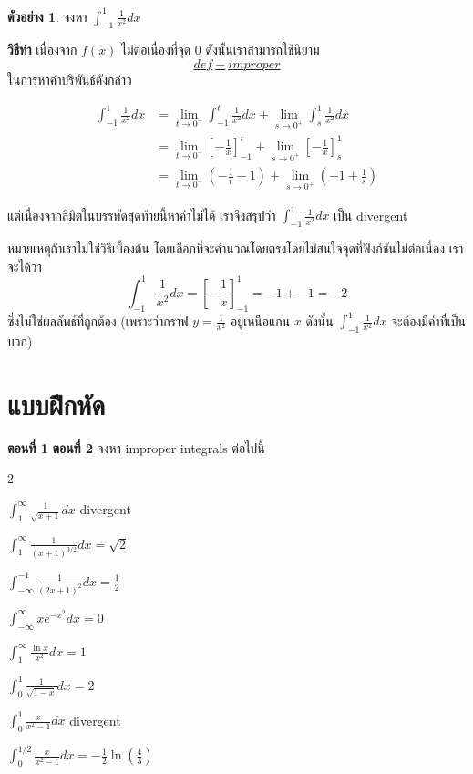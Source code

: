 \documentclass[
]{book}
\theoremstyle{definition}
\theoremstyle{definition}
\newtheorem{example}{ตัวอย่าง}[chapter]
\theoremstyle{definition}
\theoremstyle{definition}
\theoremstyle{remark}
\begin{document}
\begin{example}
จงหา \(\int_{-1}^{1} \frac{1}{x^2} dx\)
\end{example}

\textbf{วิธีทำ} เนื่องจาก \(f(x)\) ไม่ต่อเนื่องที่จุด 0 ดังนั้นเราสามารถใช้นิยาม
\hyperref[def-improper]{\[def-improper\]} ในการหาค่าปริพันธ์ดังกล่าว  

\[\begin{aligned}
        \int_{-1}^{1} \frac{1}{x^2} dx &= \lim_{t \rightarrow 0^{-} }\int_{-1}^{t} \frac{1}{x^2}dx
                                            + \lim_{s \rightarrow 0^{+}} \int_{s}^{1} \frac{1}{x^2}dx \\
        &= \lim_{t \rightarrow 0^{-}} \left[ -\frac{1}{x}\right]_{-1}^t 
        + \lim_{s \rightarrow 0^{+}} \left[ -\frac{1}{x}\right]_{s}^1 \\
        &= \lim_{t \rightarrow 0^{-}} (-\frac{1}{t} - 1) + \lim_{s \rightarrow 0^{+}} (-1 +\frac{1}{s})    
\end{aligned}\]

  แต่เนื่องจากลิมิตในบรรทัดสุดท้ายนี้หาค่าไม่ได้ เราจึงสรุปว่า
\(\int_{-1}^{1} \frac{1}{x^2} dx\) เป็น divergent

หมายเหตุถ้าเราไม่ใช่วิธีเบื้องต้น โดยเลือกที่จะคำนวณโดยตรงโดยไม่สนใจจุดที่ฟังก์ชันไม่ต่อเนื่อง
เราจะได้ว่า
\[\int_{-1}^{1} \frac{1}{x^2} dx  = \left[ -\frac{1}{x}\right]_{-1}^1 = -1 + -1 = -2\]
ซึ่งไม่ใช่ผลลัพธ์ที่ถูกต้อง (เพราะว่ากราฟ \(y = \frac{1}{x^2}\) อยู่เหนือแกน \(x\) ดังนั้น
\(\int_{-1}^{1} \frac{1}{x^2} dx\) จะต้องมีค่าที่เป็นบวก)

\section{แบบฝึกหัด}\label{uxe41uxe1auxe1auxe1duxe01uxe2buxe14-1}

\textbf{ตอนที่ 1} \textbf{ตอนที่ 2} จงหา improper integrals ต่อไปนี้

2

\(\int_{1}^{\infty} \frac{1}{\sqrt{x+1}} dx\) divergent

\(\int_{1}^{\infty} \frac{1}{(x+1)^{3/2}}dx = \sqrt{2}\)

\(\int_{-\infty}^{-1} \frac{1}{(2x + 1)^2} dx = \frac{1}{2}\)

\(\int_{-\infty}^{\infty} x e^{-x^2} dx = 0\)

\(\int_{1}^{\infty} \frac{\ln x}{x^2}  dx = 1\)

\(\int_0^1 \frac{1}{\sqrt{1-x}} dx = 2\)

\(\int_0^{1} \frac{x}{x^2-1} dx\) divergent

\(\int_0^{1/2} \frac{x}{x^2-1} dx = -\frac{1}{2} \ln (\frac{4}{3})\)




\end{document}
